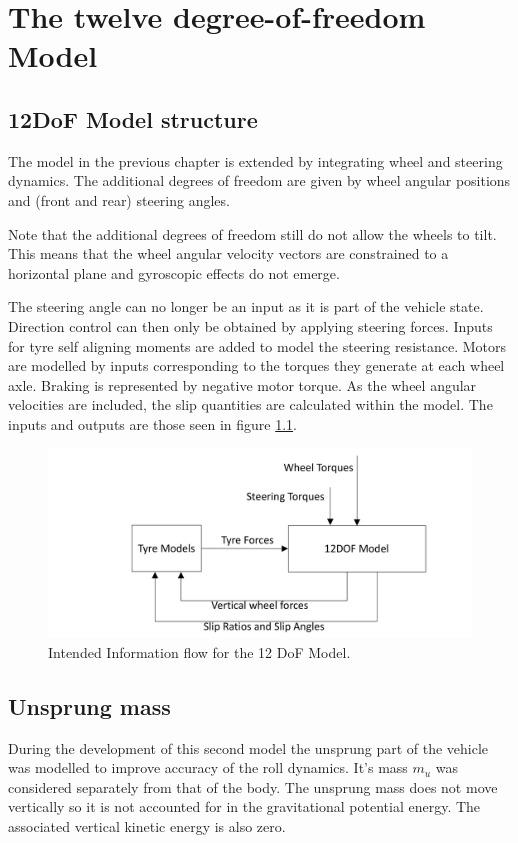\chapter{The twelve degree-of-freedom Model}
\label{chap:12dof}
\section{12DoF Model structure}
\label{sec:12dofconcept}
The model in the previous chapter is extended by integrating wheel and steering dynamics.
The additional degrees of freedom are given by wheel angular positions and (front and rear) steering angles.

Note that the additional degrees of freedom still do not allow the wheels to tilt. This means that the wheel angular velocity vectors are constrained to a horizontal plane and gyroscopic effects do not emerge.

The steering angle can no longer be an input as it is part of the vehicle state. Direction control can then only be obtained by applying steering forces.
Inputs for tyre self aligning moments are added to model the steering resistance.
Motors are modelled by inputs corresponding to the torques they generate at each wheel axle. Braking is represented by negative motor torque.
As the wheel angular velocities are included, the slip quantities are calculated within the model. The inputs and outputs are those seen in figure \ref{12flow}.
\begin{figure}[ht]
  \centering
  \includegraphics[width=\textwidth]{images/12flow}
  \caption{Intended Information flow for the 12 DoF Model.}
  \label{12flow}
\end{figure}

\section{Unsprung mass}
\label{sec:umass}
During the development of this second model the unsprung part of the vehicle was modelled to improve accuracy of the roll dynamics. It's mass $m_u$ was considered separately from that of the body.
The unsprung mass does not move vertically so it is not accounted for in the gravitational potential energy. The associated vertical kinetic energy is also zero.


